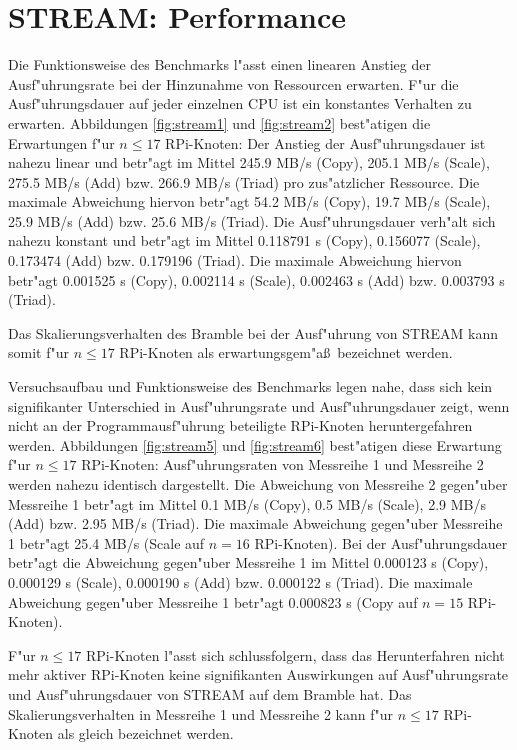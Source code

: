 \section{STREAM: Performance}\label{Interpretation-Stream}

Die Funktionsweise des Benchmarks l"asst einen linearen Anstieg der Ausf"uhrungsrate bei der Hinzunahme von Ressourcen erwarten. F"ur die Ausf"uhrungsdauer auf jeder einzelnen CPU ist ein konstantes Verhalten zu erwarten. Abbildungen \ref{fig:stream1} und \ref{fig:stream2} best"atigen die Erwartungen f"ur $n\leq 17$ RPi-Knoten: Der Anstieg der Ausf"uhrungsdauer ist nahezu linear und betr"agt im Mittel 245.9 MB/s (Copy), 205.1 MB/s (Scale), 275.5 MB/s (Add) bzw. 266.9 MB/s (Triad) pro zus"atzlicher Ressource. Die maximale Abweichung hiervon betr"agt 54.2 MB/s (Copy), 19.7 MB/s (Scale), 25.9 MB/s (Add) bzw. 25.6 MB/s (Triad). Die Ausf"uhrungsdauer verh"alt sich nahezu konstant und betr"agt im Mittel 0.118791 s (Copy), 0.156077 (Scale), 0.173474 (Add) bzw. 0.179196 (Triad). Die maximale Abweichung hiervon betr"agt 0.001525 s (Copy), 0.002114 s (Scale), 0.002463 s (Add) bzw. 0.003793 s (Triad). 

Das Skalierungsverhalten des Bramble bei der Ausf"uhrung von STREAM kann somit f"ur $n\leq 17$ RPi-Knoten als erwartungsgem"a\ss\ bezeichnet werden. 

Versuchsaufbau und Funktionsweise des Benchmarks legen nahe, dass sich kein signifikanter Unterschied in Ausf"uhrungsrate und Ausf"uhrungsdauer zeigt, wenn nicht an der Programmausf"uhrung beteiligte RPi-Knoten heruntergefahren werden. Abbildungen \ref{fig:stream5} und \ref{fig:stream6} best"atigen diese Erwartung f"ur $n\leq 17$ RPi-Knoten: Ausf"uhrungsraten von Messreihe 1 und Messreihe 2 werden nahezu identisch dargestellt. Die Abweichung von Messreihe 2 gegen"uber Messreihe 1 betr"agt im Mittel 0.1 MB/s (Copy), 0.5 MB/s (Scale), 2.9 MB/s (Add) bzw. 2.95 MB/s (Triad). Die maximale Abweichung gegen"uber Messreihe 1 betr"agt 25.4 MB/s (Scale auf $n=16$ RPi-Knoten). Bei der Ausf"uhrungsdauer betr"agt die Abweichung gegen"uber Messreihe 1 im Mittel 0.000123 s (Copy), 0.000129 s (Scale), 0.000190 s (Add) bzw. 0.000122 s (Triad). Die maximale Abweichung gegen"uber Messreihe 1 betr"agt 0.000823 s (Copy auf $n=15$ RPi-Knoten). 

F"ur $n\leq 17$ RPi-Knoten l"asst sich schlussfolgern, dass das Herunterfahren nicht mehr aktiver RPi-Knoten keine signifikanten Auswirkungen auf Ausf"uhrungsrate und Ausf"uhrungsdauer von STREAM auf dem Bramble hat. Das Skalierungsverhalten in Messreihe 1 und Messreihe 2 kann f"ur $n\leq 17$ RPi-Knoten als gleich bezeichnet werden.

